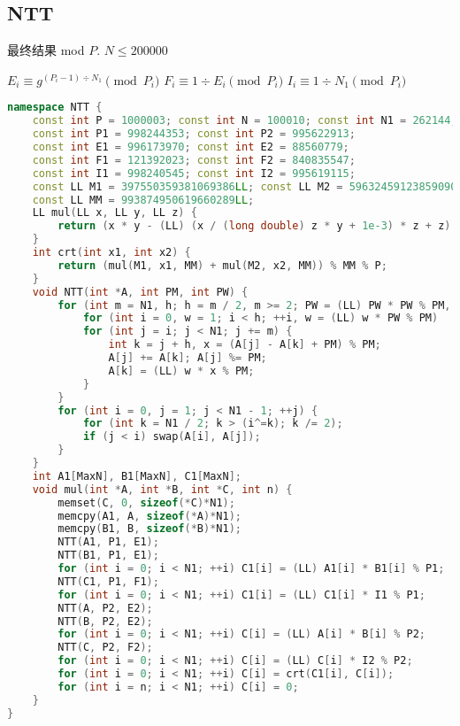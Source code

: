 \subsection{NTT}
 最终结果 mod $P$. $N \leq 200000$ 

$E_i \equiv g^{(P_i-1) \div N_1} \pmod{P_i}$ $F_i \equiv 1 \div E_i \pmod{P_i} $ $I_i \equiv 1 \div N_1 \pmod{P_i}$ 
\begin{lstlisting}[language=C++]
namespace NTT {
	const int P = 1000003; const int N = 100010; const int N1 = 262144;
	const int P1 = 998244353; const int P2 = 995622913;
	const int E1 = 996173970; const int E2 = 88560779;
	const int F1 = 121392023; const int F2 = 840835547;
	const int I1 = 998240545; const int I2 = 995619115;
	const LL M1 = 397550359381069386LL; const LL M2 = 596324591238590904LL;
	const LL MM = 993874950619660289LL;
	LL mul(LL x, LL y, LL z) {
		return (x * y - (LL) (x / (long double) z * y + 1e-3) * z + z) % z;
	}
	int crt(int x1, int x2) {
		return (mul(M1, x1, MM) + mul(M2, x2, MM)) % MM % P;
	}
	void NTT(int *A, int PM, int PW) {
		for (int m = N1, h; h = m / 2, m >= 2; PW = (LL) PW * PW % PM, m = h) {
			for (int i = 0, w = 1; i < h; ++i, w = (LL) w * PW % PM)
			for (int j = i; j < N1; j += m) {
				int k = j + h, x = (A[j] - A[k] + PM) % PM;
				A[j] += A[k]; A[j] %= PM;
				A[k] = (LL) w * x % PM;
			}
		}
		for (int i = 0, j = 1; j < N1 - 1; ++j) {
			for (int k = N1 / 2; k > (i^=k); k /= 2);
			if (j < i) swap(A[i], A[j]);
		}
	}
	int A1[MaxN], B1[MaxN], C1[MaxN];
	void mul(int *A, int *B, int *C, int n) {
		memset(C, 0, sizeof(*C)*N1);
		memcpy(A1, A, sizeof(*A)*N1);
		memcpy(B1, B, sizeof(*B)*N1);
		NTT(A1, P1, E1);
		NTT(B1, P1, E1);
		for (int i = 0; i < N1; ++i) C1[i] = (LL) A1[i] * B1[i] % P1;
		NTT(C1, P1, F1);
		for (int i = 0; i < N1; ++i) C1[i] = (LL) C1[i] * I1 % P1;
		NTT(A, P2, E2);
		NTT(B, P2, E2);
		for (int i = 0; i < N1; ++i) C[i] = (LL) A[i] * B[i] % P2;
		NTT(C, P2, F2);
		for (int i = 0; i < N1; ++i) C[i] = (LL) C[i] * I2 % P2;
		for (int i = 0; i < N1; ++i) C[i] = crt(C1[i], C[i]);
		for (int i = n; i < N1; ++i) C[i] = 0;
	}
}
\end{lstlisting}
